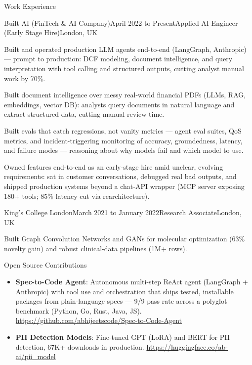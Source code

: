 \documentclass{resume} %
\begin{document}
\begin{rSection}{Work Experience}
\begin{rSubsection}{Built AI (FinTech \& AI Company)}{April 2022 to Present}{Applied AI Engineer (Early Stage Hire)}{London, UK}
\item Built and operated production LLM agents end-to-end (LangGraph, Anthropic) --- prompt to production: DCF modeling, document intelligence, and query interpretation with tool calling and structured outputs, cutting analyst manual work by 70\%.
\item Built document intelligence over messy real-world financial PDFs (LLMs, RAG, embeddings, vector DB): analysts query documents in natural language and extract structured data, cutting manual review time.
\item Built evals that catch regressions, not vanity metrics --- agent eval suites, QoS metrics, and incident-triggering monitoring of accuracy, groundedness, latency, and failure modes --- reasoning about why models fail and which model to use.
\item Owned features end-to-end as an early-stage hire amid unclear, evolving requirements: sat in customer conversations, debugged real bad outputs, and shipped production systems beyond a chat-API wrapper (MCP server exposing 180+ tools; 85\% latency cut via rearchitecture).
\end{rSubsection}


\begin{rSubsection}{King's College London}{March 2021 to January 2022}{Research Associate}{London, UK}
\item Built Graph Convolution Networks and GANs for molecular optimization (63\% novelty gain) and robust clinical-data pipelines (1M+ rows).

\end{rSubsection}

\end{rSection}

\begin{rSection}{Open Source Contributions}
\begin{itemize}\setlength\itemsep{-0.4em}
    \item \textbf{Spec-to-Code Agent}: Autonomous multi-step ReAct agent (LangGraph + Anthropic) with tool use and orchestration that ships tested, installable packages from plain-language specs --- 9/9 pass rate across a polyglot benchmark (Python, Go, Rust, Java, JS). \url{https://github.com/abhijeetscode/Spec-to-Code-Agent}
    \item \textbf{PII Detection Models}: Fine-tuned GPT (LoRA) and BERT for PII detection, 67K+ downloads in production. \url{https://huggingface.co/ab-ai/pii_model}

\end{itemize}
\end{rSection}
\end{document}
